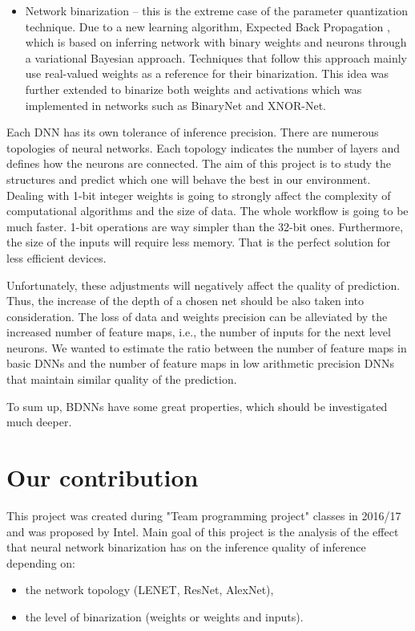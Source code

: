 \documentclass[licencjacka]{pracamgr}
\begin{document}
\begin{itemize}
		\item Network binarization -- this is the extreme case of the parameter quantization technique. Due to a new learning algorithm, Expected Back Propagation \cite{exp}, which is based on inferring network with binary weights and neurons through a variational Bayesian approach. Techniques that follow this approach mainly use real-valued weights as a reference for their binarization. This idea was further extended to binarize both weights and activations which was implemented in networks such as BinaryNet and XNOR-Net. 

	\end{itemize}

	Each DNN has its own tolerance of inference precision. There are numerous topologies of neural networks. Each topology indicates the number of layers and defines how the neurons are connected. The aim of this project is to study the structures and predict which one will behave the best in our environment. Dealing with 1-bit integer weights is going to strongly affect the complexity of computational algorithms and the size of data. The whole workflow is going to be much faster. 1-bit operations are way simpler than the 32-bit ones. Furthermore, the size of the inputs will require less memory. That is the perfect solution for less efficient devices.
	
	Unfortunately, these adjustments will negatively affect the quality of prediction. Thus, the increase of the depth of a chosen net should be also taken into consideration.  The loss of data and weights precision can be alleviated by the increased number of feature maps, i.e., the number of inputs for the next level neurons. We wanted to estimate the ratio between the number of feature maps in basic DNNs and the number of feature maps in low arithmetic precision DNNs that maintain similar quality of the prediction.
	
	 To sum up, BDNNs have some great properties, which should be investigated much deeper.

	\section{Our contribution}
	
	This project was created during "Team programming project" classes in 2016/17 and was proposed by Intel. Main goal of this project is the analysis of the effect that neural network binarization has on the inference quality of inference depending on:
	\begin{itemize}
	    \item the network topology (LENET, ResNet, AlexNet),
	    \item the level of binarization (weights or weights and inputs).
	\end{itemize}
	
\end{document}
